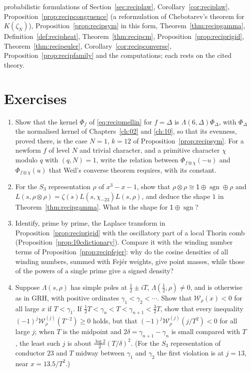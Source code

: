 probabilistic formulations of Section~\ref{sec:reciplaw}, Corollary~\ref{cor:reciplaw}, Proposition~\ref{prop:recipcongruence} (a reformulation of Chebotarev's theorem for $K(\zeta_N)$), Proposition~\ref{prop:recipsym} in this form, Theorem~\ref{thm:recipgamma}, Definition~\ref{def:recipheat}, Theorem~\ref{thm:recipcm}, Proposition~\ref{prop:reciprigid}, Theorem~\ref{thm:recipeuler}, Corollary~\ref{cor:recipconverse}, Proposition~\ref{prop:recipfamily} and the computations; each rests on the cited theory.

\section{Exercises}

\begin{enumerate}
\item\label{ex:recipdelta} Show that the kernel $\Phi_f$ of \eqref{eq:recipmellin} for $f=\Delta$ is $\Lambda(6,\Delta)\Phi_\Delta$, with $\Phi_\Delta$ the normalised kernel of Chapters~\ref{ch:02} and \ref{ch:10}, so that its evenness, proved there, is the case $N=1$, $k=12$ of Proposition~\ref{prop:recipsym}. For a newform $f$ of level $N$ and trivial character, and a primitive character $\chi$ modulo $q$ with $(q,N)=1$, write the relation between $\Phi_{f\otimes\chi}(-u)$ and $\Phi_{f\otimes\bar\chi}(u)$ that Weil's converse theorem requires, with its constant.
\item\label{ex:recipshape} For the $S_3$ representation $\rho$ of $x^3-x-1$, show that $\rho\otimes\rho\cong\mathsf{1}\oplus\operatorname{sgn}\oplus\rho$ and $L(s,\rho\otimes\rho)=\zeta(s)L(s,\chi_{-23})L(s,\rho)$, and deduce the shape $1$ in Theorem~\ref{thm:recipgamma}. What is the shape for $\mathsf{1}\oplus\operatorname{sgn}$?
\item\label{ex:recipgauss} Identify, prime by prime, the Laplace transform in Proposition~\ref{prop:reciprigid} with the oscillatory part of a local Thorin comb (Proposition~\ref{prop:10cdictionary}). Compare it with the winding number terms of Proposition~\ref{prop:recipfejer}: why do the cosine densities of all winding numbers, summed with Fej\'er weights, give point masses, while those of the powers of a single prime give a signed density?
\item\label{ex:recippole} Suppose $\Lambda(s,\rho)$ has simple poles at $\frac12\pm iT$, $\Lambda(\frac12,\rho)\ne0$, and is otherwise as in GRH, with positive ordinates $\gamma_1<\gamma_2<\cdots$. Show that $\mathcal W_\rho(x)<0$ for all large $x$ if $T<\gamma_1$. If $\frac12T<\gamma_n<T<\gamma_{n+1}<\frac32T$, show that every inequality $(-1)^j\mathcal W_\rho^{(j)}(T^{-2})\ge0$ holds, but that $(-1)^j\mathcal W_\rho^{(j)}(j/T^2)<0$ for all large $j$; when $T$ is the midpoint and $2\delta=\gamma_{n+1}-\gamma_n$ is small compared with $T$, the least such $j$ is about $\frac{\log2}2(T/\delta)^2$. (For the $S_3$ representation of conductor $23$ and $T$ midway between $\gamma_1$ and $\gamma_2$ the first violation is at $j=13$, near $x=13.5/T^2$.)

\end{enumerate}
